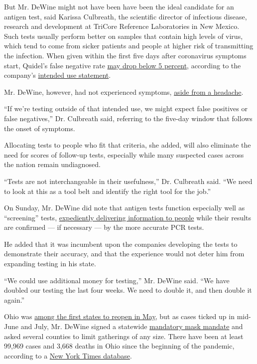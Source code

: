But Mr. DeWine might not have been have been the ideal candidate for an
antigen test, said Karissa Culbreath, the scientific director of
infectious disease, research and development at TriCore Reference
Laboratories in New Mexico. Such tests usually perform better on samples
that contain high levels of virus, which tend to come from sicker
patients and people at higher risk of transmitting the infection. When
given within the first five days after coronavirus symptoms start,
Quidel's false negative rate
\href{https://www.businesswire.com/news/home/20200717005579/en/Quidel\%E2\%80\%99s-Sofia\%C2\%AE-SARS-Antigen-FIA-Updates-EUA}{may
drop below 5 percent}, according to the company's
\href{https://www.quidel.com/sites/default/files/product/documents/EF1438902EN00.pdf}{intended
use statement}.

Mr. DeWine, however, had not experienced symptoms,
\href{https://www.nytimes3xbfgragh.onion/2020/08/06/us/mike-dewine-coronavirus.html}{aside
from a headache}.

``If we're testing outside of that intended use, we might expect false
positives or false negatives,'' Dr. Culbreath said, referring to the
five-day window that follows the onset of symptoms.

Allocating tests to people who fit that criteria, she added, will also
eliminate the need for scores of follow-up tests, especially while many
suspected cases across the nation remain undiagnosed.

``Tests are not interchangeable in their usefulness,'' Dr. Culbreath
said. ``We need to look at this as a tool belt and identify the right
tool for the job.''

On Sunday, Mr. DeWine did note that antigen tests function especially
well as ``screening'' tests,
\href{https://www.nytimes3xbfgragh.onion/2020/08/06/health/rapid-Covid-tests.html}{expediently
delivering information to people} while their results are confirmed ---
if necessary --- by the more accurate PCR tests.

He added that it was incumbent upon the companies developing the tests
to demonstrate their accuracy, and that the experience would not deter
him from expanding testing in his state.

``We could use additional money for testing,'' Mr. DeWine said. ``We
have doubled our testing the last four weeks. We need to double it, and
then double it again.''

Ohio was
\href{https://www.nytimes3xbfgragh.onion/interactive/2020/us/states-reopen-map-coronavirus.html}{among
the first states to reopen in May}, but as cases ticked up in mid-June
and July, Mr. DeWine signed a statewide
\href{https://www.nytimes3xbfgragh.onion/interactive/2020/us/states-reopen-map-coronavirus.html}{mandatory
mask mandate} and asked several counties to limit gatherings of any
size. There have been at least 99,969 cases and 3,668 deaths in Ohio
since the beginning of the pandemic, according to a
\href{https://www.nytimes3xbfgragh.onion/interactive/2020/us/ohio-coronavirus-cases.html}{New
York Times database}.

